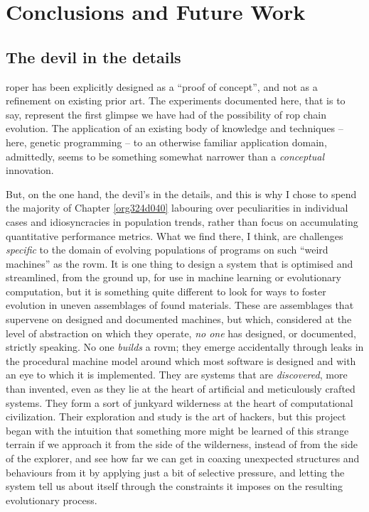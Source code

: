 \documentclass[12pt,glossary]{dalthesis}
\begin{document}
\chapter{Conclusions and Future Work}
\label{sec:orgd7b914c}
\label{orgeb7900f}

\section{The devil in the details}
\label{sec:org5b3d2ae}

\Gls{roper} has been explicitly designed as a ``proof of concept'', and not
as a refinement on existing prior art. The experiments documented here,
that is to say, represent the first glimpse we have had of the possibility
of \gls{rop} chain evolution. The application of an existing body of knowledge
and techniques -- here, genetic programming -- to an otherwise familiar
application domain, admittedly, seems to be something somewhat narrower than
a \emph{conceptual} innovation. 

But, on the one hand, the devil's in the details, and this is why I chose to
spend the majority of Chapter \ref{org324d040} labouring over peculiarities
in individual cases and idiosyncracies in population trends, rather than focus
on accumulating quantitative performance metrics. What we find there, I think,
are challenges \emph{specific} to the domain of evolving populations of programs on
such ``weird machines'' as the \gls{rovm}. It is one thing to design a system that
is optimised and streamlined, from the ground up, for use in machine learning
or evolutionary computation, but it is something quite different to look for
ways to foster evolution in uneven assemblages of found materials. These are
assemblages that supervene on designed and documented machines, but which,
considered at the level of abstraction on which they operate, \emph{no one} has
designed, or documented, strictly speaking. No one \emph{builds} a \gls{rovm}; they
emerge accidentally through leaks in the procedural machine model around which
most software is designed and with an eye to which it is implemented. They
are systems that are \emph{discovered}, more than invented, even as they lie at
the heart of artificial and meticulously crafted systems. They form a sort
of junkyard wilderness at the heart of computational civilization. Their
exploration and study is the art of hackers, but this project began with the
intuition that something more might be learned of this strange terrain if
we approach it from the side of the wilderness, instead of from the side of
the explorer, and see how far we can get in coaxing unexpected structures 
and behaviours from it by applying just a bit of selective pressure, and
letting the system tell us about itself through the constraints it imposes 
on the resulting evolutionary process. 
\end{document}
